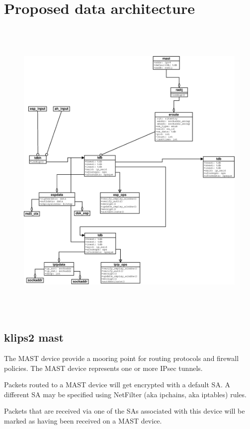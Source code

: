 \section{Proposed data architecture}

\begin{figure}
\includegraphics[height=6in,width=6in]{diagrams/klips2_tdb.eps} 
\label{KLIPS2 data structures}
\end{figure}

\subsection{klips2 mast}

The MAST device provide a mooring point for routing protocols and firewall
policies. The MAST device represents one or more IPsec tunnels. 

Packets routed to a MAST device will get encrypted with a default SA.
A different SA may be specified using NetFilter (aka ipchains, aka iptables)
rules. 

Packets that are received via one of the SAs associated with this device
will be marked as having been received on a MAST device. 

